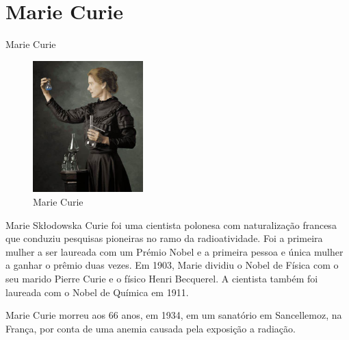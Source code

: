 \documentclass[presentation,professionalfonts,aspectratio=169]{beamer}
\begin{document}
\section{Marie Curie}
\label{sec:org421f969}
\begin{frame}[label={sec:orgcf4d18a}]{Marie Curie}
\vspace{-1.0cm}
\begin{figure}
\centering
\includegraphics[width=0.38\textwidth]{FQ/Radioatividade/Marie.jpeg}
\caption{Marie Curie}
\end{figure}

Marie Skłodowska Curie foi uma cientista polonesa com naturalização francesa que conduziu pesquisas pioneiras no ramo da radioatividade. Foi a primeira mulher a ser laureada com um Prémio Nobel e a primeira pessoa e única mulher a ganhar o prêmio duas vezes. Em 1903, Marie dividiu o Nobel de \alert{Física} com o seu marido Pierre Curie e o físico Henri Becquerel. A cientista também foi laureada com o Nobel de \alert{Química} em 1911.

Marie Curie morreu aos 66 anos, em 1934, em um sanatório em Sancellemoz, na França, por conta de uma anemia causada pela exposição a radiação.
\end{frame}
\end{document}
